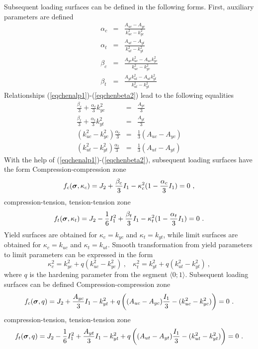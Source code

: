 Subsequent loading surfaces can be defined in the following forms.
First, auxiliary parameters are defined
\begin{eqnarray}\label{eqchenalp1}
\alpha_c &=& \frac{A_{uc}-A_{yc}}{k_{uc}^2-k_{yc}^2}
\\ \label{eqchenalp2}
\alpha_t &=& \frac{A_{ut}-A_{yt}}{k_{ut}^2-k_{yt}^2}
\\ \label{eqchenbeta1}
\beta_c &=& \frac{A_{yc}k_{uc}^2 - A_{uc}k_{yc}^2}{k_{uc}^2-k_{yc}^2}
\\ \label{eqchenbeta2}
\beta_t &=& \frac{A_{yt}k_{ut}^2 - A_{ut}k_{yt}^2}{k_{ut}^2-k_{yt}^2}
\end{eqnarray}
Relationships (\ref{eqchenalp1})-(\ref{eqchenbeta2}) lead to the following equalities
\begin{eqnarray}
\frac{\beta_c}{3} + \frac{\alpha_c}{3}k_{yc}^2 &=& \frac{A_{yc}}{3}
\\
\frac{\beta_t}{3} + \frac{\alpha_t}{3}k_{yt}^2 &=& \frac{A_{yt}}{3}
\\
(k_{uc}^2 - k_{yc}^2) \frac{\alpha_c}{3} &=& \frac{1}{3}(A_{uc}-A_{yc})
\\
(k_{ut}^2 - k_{yt}^2) \frac{\alpha_t}{3} &=& \frac{1}{3}(A_{ut}-A_{yt})
\end{eqnarray}
With the help of (\ref{eqchenalp1})-(\ref{eqchenbeta2}), subsequent loading surfaces have the form
Compression-compression zone
\begin{equation}
f_{c} (\mbf{\sigma},\kappa_c) = J_2 + \del{\beta_c}{3} I_1 - \kappa^2_c (1-\del{\alpha_c}{3}I_1) = 0\ ,
\end{equation}
compression-tension, tension-tension zone
\begin{equation}
f_{t} (\mbox{\boldmath$\sigma$},\kappa_t) = J_2 -\mbox{$\displaystyle\frac{1}{6}$}I_1^2 + \mbox{$\displaystyle\frac{\beta_t}{3}$} I_1 - \kappa^2_t (1-\mbox{$\displaystyle\frac{\alpha_t}{3}$}I_1) = 0\ .
\end{equation}
Yield surfaces are obtained for $\kappa_c=k_{yc}$ and $\kappa_t=k_{yt}$, while limit surfaces are obtained
for $\kappa_c=k_{uc}$ and $\kappa_t=k_{ut}$. Smooth transformation from yield parameters to limit parameters
can be expressed in the form
\begin{equation}
\kappa^2_c = k^2_{yc} + q (k^2_{uc} - k^2_{yc})\ ,
\ \ \ \
\kappa^2_t = k^2_{yt} + q (k^2_{ut} - k^2_{yt})\ ,
\end{equation}
where $q$ is the hardening parameter from the segment $\langle0;1\rangle$.
Subsequent loading surfaces can be defined
Compression-compression zone
\begin{equation}
f_{c} (\mbf{\sigma},q) = J_2 + \del{A_{yc}}{3} I_1 - k^2_{yt} +
q \left((A_{uc}-A_{yc})\del{I_1}{3} - (k^2_{uc}-k^2_{yc})\right) = 0\ .
\end{equation}
compression-tension, tension-tension zone
\begin{equation}
f_{t} (\mbf{\sigma},q) = J_2 -\del{1}{6}I_1^2 + \del{A_{yt}}{3} I_1 - k^2_{yt} +
q \left((A_{ut}-A_{yt}) \del{I_1}{3} - (k^2_{ut}-k^2_{yt})\right) = 0\ .
\end{equation}

